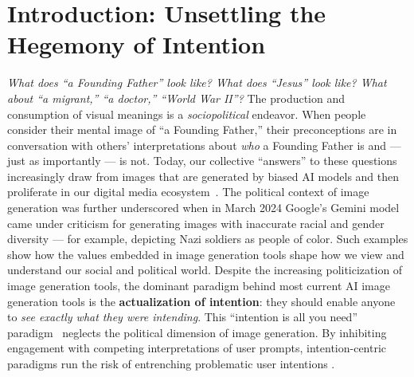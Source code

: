\section{Introduction: Unsettling the Hegemony of Intention}
\label{intro}



\textit{What does ``a Founding Father'' look like? What does ``Jesus'' look like? What about ``a migrant,'' ``a doctor,'' ``World War II''?}
The production and consumption of visual meanings is a \textit{sociopolitical} endeavor.
When people consider their mental image of ``a Founding Father,'' their preconceptions are in conversation with others' interpretations about \textit{who} a Founding Father is and --- just as importantly --- is not.
Today, our collective ``answers'' to these questions increasingly draw from images that are generated by biased AI models and then proliferate in our digital media ecosystem~\cite{jingnan2024ai, diresta2024spammers, herrieetal2024democratization}. The political context of image generation was further underscored when in March 2024 Google's Gemini model came under criticism for generating images with inaccurate racial and gender diversity --- for example, depicting Nazi soldiers as people of color. 
Such examples show how the values embedded in image generation tools shape how we view and understand our social and political world.
Despite the increasing politicization of image generation tools, the dominant paradigm behind most current AI image generation tools is the \textbf{actualization of intention}: they should enable anyone to \textit{see exactly what they were intending}.
This ``intention is all you need'' paradigm~\cite{sarkar2024intention} neglects the political dimension of image generation. 
By inhibiting engagement with competing interpretations of user prompts, intention-centric paradigms run the risk of entrenching problematic user intentions \cite{cai2024antagonisticai}.

